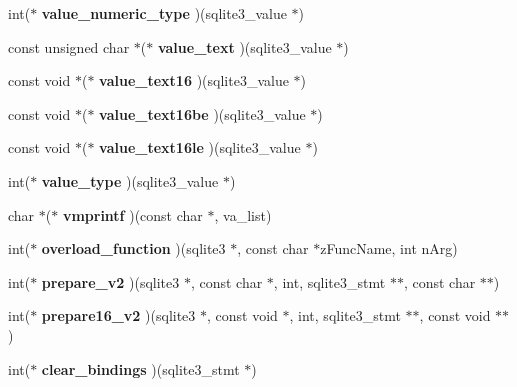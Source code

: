 \begin{CompactItemize}
\item 
int($\ast$ \textbf{value\_\-numeric\_\-type} )(sqlite3\_\-value $\ast$)\label{structsqlite3__api__routines_1c6a8035966527371c64ff22ad251857}

\item 
const unsigned char $\ast$($\ast$ \textbf{value\_\-text} )(sqlite3\_\-value $\ast$)\label{structsqlite3__api__routines_be14a00d2f88559b155e84569f355190}

\item 
const void $\ast$($\ast$ \textbf{value\_\-text16} )(sqlite3\_\-value $\ast$)\label{structsqlite3__api__routines_3cdd34fde377f5bbf37ba5cecbbc9ed7}

\item 
const void $\ast$($\ast$ \textbf{value\_\-text16be} )(sqlite3\_\-value $\ast$)\label{structsqlite3__api__routines_1e75569d37ccbc28e24545c12f0b6320}

\item 
const void $\ast$($\ast$ \textbf{value\_\-text16le} )(sqlite3\_\-value $\ast$)\label{structsqlite3__api__routines_1ff6b93be70f2aeafb9920602bd8bd8f}

\item 
int($\ast$ \textbf{value\_\-type} )(sqlite3\_\-value $\ast$)\label{structsqlite3__api__routines_ffe88bff4b7cecdcb2a1adb719648405}

\item 
char $\ast$($\ast$ \textbf{vmprintf} )(const char $\ast$, va\_\-list)\label{structsqlite3__api__routines_53b5ad4f776be9610d1a902dcdfb46c7}

\item 
int($\ast$ \textbf{overload\_\-function} )(sqlite3 $\ast$, const char $\ast$zFuncName, int nArg)\label{structsqlite3__api__routines_c85e89a1ce3eb9318e4653b542c0eff1}

\item 
int($\ast$ \textbf{prepare\_\-v2} )(sqlite3 $\ast$, const char $\ast$, int, sqlite3\_\-stmt $\ast$$\ast$, const char $\ast$$\ast$)\label{structsqlite3__api__routines_58099ce19816a66c90763e18e2a48a95}

\item 
int($\ast$ \textbf{prepare16\_\-v2} )(sqlite3 $\ast$, const void $\ast$, int, sqlite3\_\-stmt $\ast$$\ast$, const void $\ast$$\ast$)\label{structsqlite3__api__routines_d1ff561fae4cafcd84457c135014c668}

\item 
int($\ast$ \textbf{clear\_\-bindings} )(sqlite3\_\-stmt $\ast$)\label{structsqlite3__api__routines_d3b4576b95aeaad7901189be22ff181d}


\end{CompactItemize}
